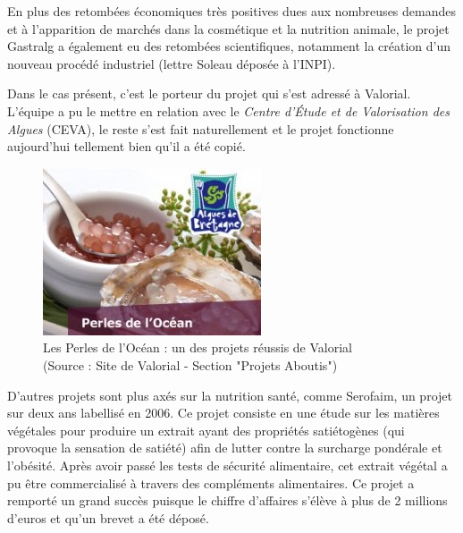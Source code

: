 \documentclass[a4paper,12pt]{report}
\begin{document}
				En plus des retombées économiques très positives dues aux nombreuses demandes et à l’apparition de marchés dans la cosmétique et la nutrition animale, le projet Gastralg a également eu des retombées scientifiques, notamment la création d’un nouveau procédé industriel (lettre Soleau déposée à l’INPI).

	Dans le cas présent, c’est le porteur du projet qui s’est adressé à Valorial. L’équipe a pu le mettre en relation avec le \textit{Centre d’Étude et de Valorisation des Algues} (CEVA), le reste s’est fait naturellement et le projet fonctionne aujourd’hui tellement bien qu’il a été copié.

\begin{figure}[!h]
			\centering
			\includegraphics[scale=0.5]{Illustrations/PerlesOcean.jpg}
			\caption{Les Perles de l'Océan : un des projets réussis de Valorial\\(Source : Site de Valorial - Section "Projets Aboutis"\cite{ProjetsAboutis})}
			\label{PerlesOcean}
			\end{figure}

				D’autres projets sont plus axés sur la nutrition santé, comme Serofaim, un projet sur deux ans labellisé en 2006. Ce projet consiste en une étude sur les matières végétales pour produire un extrait ayant des propriétés satiétogènes (qui provoque la sensation de satiété) afin de lutter contre la surcharge pondérale et l’obésité. Après avoir passé les tests de sécurité alimentaire, cet extrait végétal a pu être commercialisé à travers des compléments alimentaires. Ce projet a remporté un grand succès puisque le chiffre d’affaires s’élève à plus de 2 millions d’euros et qu’un brevet a été déposé.
				
\end{document}
